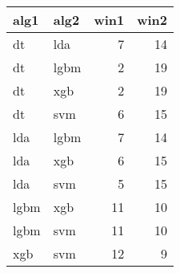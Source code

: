 \begin{tabular}{llrr}
  \toprule
{\bfseries alg1} & {\bfseries alg2} & {\bfseries win1} & {\bfseries win2} \\ 
  \midrule
dt & lda & 7 & 14 \\ 
  dt & lgbm & 2 & 19 \\ 
  dt & xgb & 2 & 19 \\ 
  dt & svm & 6 & 15 \\ 
  lda & lgbm & 7 & 14 \\ 
  lda & xgb & 6 & 15 \\ 
  lda & svm & 5 & 15 \\ 
  lgbm & xgb & 11 & 10 \\ 
  lgbm & svm & 11 & 10 \\ 
  xgb & svm & 12 & 9 \\ 
   \bottomrule
\end{tabular}
